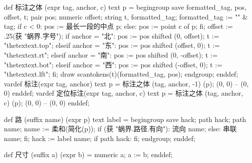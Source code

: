 def 标注之体 (expr tag, anchor, c) text p =
  begingroup
    save formatted_tag, pos, offset, t;
    pair pos; numeric offset; string t, formatted_tag;
    formatted_tag := "\tfx" & tag;
    if c < 0:
      pos := 最长一段的中点 p;
    else:
      pos := point c of p;
    fi;
    offset := .25(获 "蜗界.字号");
    if anchor = "北":
      pos := pos shifted (0, offset);
      t := "thetextext.top";
    elseif anchor = "东":
      pos := pos shifted (offset, 0);
      t := "thetextext.rt";
    elseif anchor = "南":
      pos := pos shifted (0, -offset);
      t := "thetextext.bot";
    elseif anchor = "西":
      pos := pos shifted (-offset, 0);
      t := "thetextext.lft";
    fi;
    draw scantokens(t)(formatted_tag, pos);
  endgroup;
enddef;
vardef 标注(expr tag, anchor) text p =
  标注之体 (tag, anchor, -1) (p);
  (0, 0) -- (0, 0)
enddef;
vardef 定位标注(expr tag, anchor, c) text p =
  标注之体 (tag, anchor, c) (p);
  (0, 0) -- (0, 0)
enddef;
\stopMPinclusions

\startMPinclusions[+]
def 路 (suffix name) (expr p) text label =
  begingroup
  save hack; path hack;
  path name; name := 柔和(简化(p));
  if (获 "蜗界.路径.有向"):
    流向 name;
  else:
    串联 name;
  fi;
  hack := label name;
  if path hack: fi;
  endgroup;
enddef;
\stopMPinclusions

\startMPinclusions[+]
def 尺寸 (suffix a) (expr b) =
  numeric a;
  a := b;
enddef;
\stopMPinclusions
